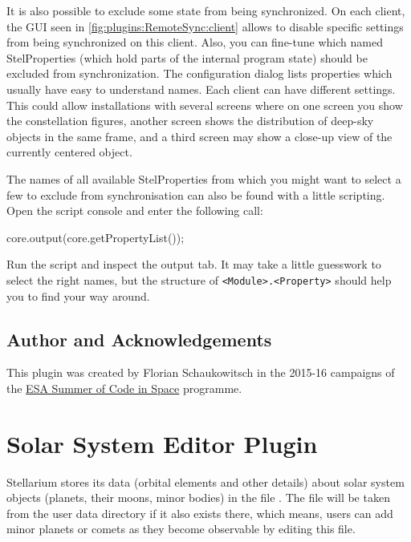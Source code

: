 It is also possible to exclude some state from being synchronized. On each
client, the GUI seen in \autoref{fig:plugins:RemoteSync:client} allows to
disable specific settings from being synchronized on this client. Also, you can
fine-tune which named StelProperties (which hold parts of the internal program state) 
should be excluded from synchronization. 
The configuration dialog lists properties which usually have easy to understand names. 
Each client can have different settings. This could allow installations with several screens
where on one screen you show the constellation figures, another screen shows the
distribution of deep-sky objects in the same frame, and a third screen may show
a close-up view of the currently centered object.

The names of all available StelProperties from which you might want to select a few to exclude  
from synchronisation can also be found with a little scripting. 
Open the script console  and enter the following call:
\begin{commands}
core.output(core.getPropertyList());
\end{commands}
Run the script and inspect the output tab. It may take a little guesswork to select the right names, but the structure of 
\texttt{<Module>.<Property>} should help you to find your way around.

\subsection*{Author and Acknowledgements}

This plugin was created by Florian Schaukowitsch in the 2015-16 campaigns of the 
\href{http://sophia.estec.esa.int/socis/}{ESA Summer of Code in Space} 
programme. 

% 


\newpage

\section{Solar System Editor Plugin}
\label{sec:plugins:SolarSystemEditor}

Stellarium stores its data (orbital elements and other details) about
solar system objects (planets, their moons, minor bodies) in the file
. The file will be taken from the user data
directory if it also exists there, which means, users can add minor
planets or comets as they become observable by editing this file.


